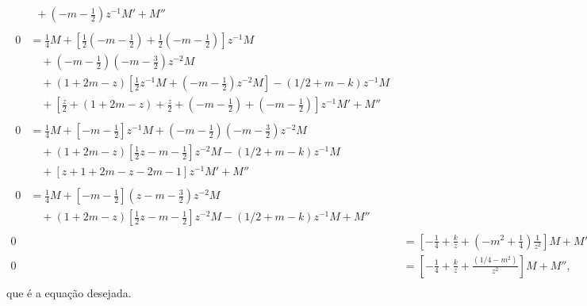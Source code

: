 \documentclass[a4paper,12pt, leqno, answers]{exam}
\begin{document}
\begin{questions}
\begin{solution}
\begin{align*}
\begin{split}
                &\quad {}+ \left( -m - \frac{1}{2} \right) z^{-1} M' + M''
            \end{split} \\
            \begin{split}
                0 &= \frac{1}{4} M + \left[ \frac{1}{2} \left( -m - \frac{1}{2}  \right) + \frac{1}{2} \left( -m - \frac{1}{2} \right) \right] z^{-1} M \\
                &\quad {}+ \left( -m - \frac{1}{2} \right) \left( -m - \frac{3}{2} \right) z^{-2} M  \\
                &\quad {}+ (1 + 2 m - z) \left[ \frac{1}{2} z^{-1} M + \left( -m - \frac{1}{2} \right) z^{-2} M \right] - (1/2 + m - k) z^{-1} M \\
                &\quad {}+ \left[ \frac{z}{2} + (1 + 2 m - z) + \frac{z}{2} + \left( -m - \frac{1}{2} \right) + \left( -m - \frac{1}{2} \right) \right] z^{-1} M' + M''
            \end{split} \\
            \begin{split}
                0 &= \frac{1}{4} M + \left[ -m - \frac{1}{2} \right] z^{-1} M + \left( -m - \frac{1}{2} \right) \left( -m - \frac{3}{2} \right) z^{-2} M  \\
                &\quad {}+ (1 + 2 m - z) \left[ \frac{1}{2} z - m - \frac{1}{2} \right] z^{-2} M - (1/2 + m - k) z^{-1} M \\
                &\quad {}+ \left[ z + 1 + 2 m - z - 2m - 1 \right] z^{-1} M' + M''
            \end{split} \\
            \begin{split}
                0 &= \frac{1}{4} M + \left[ -m - \frac{1}{2} \right] \left( z - m - \frac{3}{2} \right) z^{-2} M  \\
                &\quad {}+ (1 + 2 m - z) \left[ \frac{1}{2} z - m - \frac{1}{2} \right] z^{-2} M - (1/2 + m - k) z^{-1} M + M''
            \end{split} \\
            0 &= \left[ -\frac{1}{4} + \frac{k}{z} + \left( -m^2 + \frac{1}{4} \right) \frac{1}{z^2} \right] M + M'' \\
            0 &= \left[ -\frac{1}{4} + \frac{k}{z} + \frac{(1/4 - m^2)}{z^2} \right] M + M'', \\
        \end{align*}
        que \'{e} a equa\c{c}\~{a}o desejada.
    \end{solution}


\end{questions}
\end{document}
